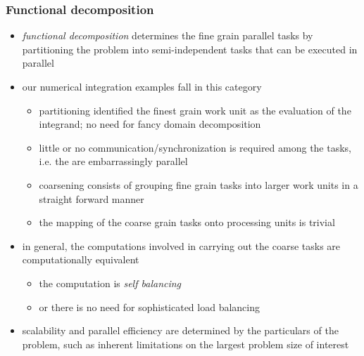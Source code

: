 %
%
%
%


\begin{frame}[fragile]
%
  \frametitle{Functional decomposition}
%
  \begin{itemize}
%
  \item {\em functional decomposition} determines the fine grain parallel tasks by partitioning
    the problem into semi-independent tasks that can be executed in parallel
%
  \item our numerical integration examples fall in this category
    \begin{itemize}
    \item partitioning identified the finest grain work unit as the evaluation of the
      integrand; no need for fancy domain decomposition
    \item little or no communication/synchronization is required among the tasks, i.e. the are
      embarrassingly parallel
    \item coarsening consists of grouping fine grain tasks into larger work units in a straight
      forward manner
    \item the mapping of the coarse grain tasks onto processing units is trivial
    \end{itemize}
%
  \item in general, the computations involved in carrying out the coarse tasks are
    computationally equivalent
    \begin{itemize}
    \item the computation is {\em self balancing}
    \item or there is no need for sophisticated load balancing
    \end{itemize}
%
  \item scalability and parallel efficiency are determined by the particulars of the problem,
    such as inherent limitations on the largest problem size of interest
%
  \end{itemize}
%
\end{frame}

